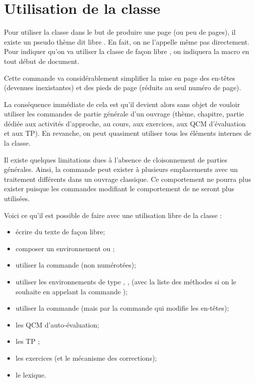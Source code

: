 \documentclass[nocrop]{sesamanuel}
\begin{document}
\cours
\section{Utilisation de la classe}
Pour utiliser la classe dans le but de produire une page (ou peu de
pages), il existe un pseudo thème dit \og libre \fg{}. En fait, on ne
l'appelle même pas directement. Pour indiquer qu'on va utiliser la
classe de façon \og libre \fg{}, on indiquera la macro  en
tout début de document.

Cette commande va considérablement simplifier la mise en page des
en-têtes (devenues inexistantes) et des pieds de page (réduits au seul
numéro de page).

La conséquence immédiate de cela est qu'il devient alors sans objet de
vouloir utiliser les commandes de partie générale d'un ouvrage
(thème, chapitre, partie dédiée aux activités d'approche, au cours,
aux exercices, aux QCM d'évaluation et aux TP). En revanche, on peut
quasiment utiliser tous les éléments internes de la classe.

Il existe quelques limitations dues à l'absence de cloisonnement de
parties générales. Ainsi, la commande  peut exister à
plusieurs emplacements avec un traitement différents dans un ouvrage
classique. Ce comportement ne pourra plus exister puisque les
commandes modifiant le comportement de  ne seront plus
utilisées.

Voici ce qu'il est possible de faire avec une utilisation \og libre
\fg{} de la classe :
\begingroup
{}
\begin{itemize}
\item écrire du texte de façon libre;
\item composer un environnement  ou ;
\item utiliser la commande  (non numérotées);
\item utiliser les environnements de type ,
  ,  (avec la liste des méthodes si
  on le souhaite en appelant la commande );
\item utiliser la commande  (mais par la commande
   qui modifie les en-têtes);
\item les QCM d'auto-évaluation;
\item les TP ;
\item les exercices (et le mécanisme des corrections);
\item le lexique.
\end{itemize}
\endgroup
\end{document}
